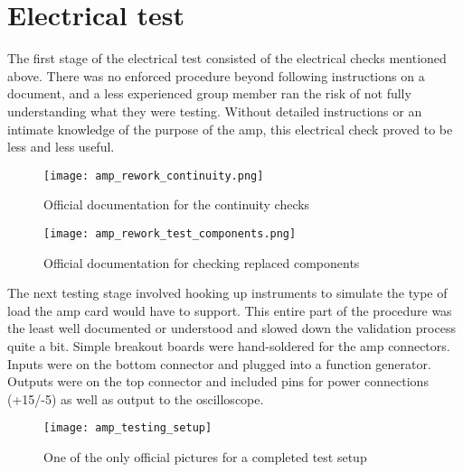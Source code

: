 \section{Electrical test}
The first stage of the electrical test consisted of the electrical checks mentioned above. There was no enforced procedure beyond following instructions on a document, and a less experienced group member ran the risk of not fully understanding what they were testing. Without detailed instructions or an intimate knowledge of the purpose of the amp, this electrical check proved to be less and less useful. \par
\begin{figure}[!htb]
	\texttt{[image: amp\_rework\_continuity.png]}
	\centering
	\caption{Official documentation for the continuity checks}
	\centering
\end{figure}
\begin{figure}[!htb]
	\texttt{[image: amp\_rework\_test\_components.png]}
	\centering
	\caption{Official documentation for checking replaced components}
	\centering
\end{figure}
The next testing stage involved hooking up instruments to simulate the type of load the amp card would have to support. This entire part of the procedure was the least well documented or understood and slowed down the validation process quite a bit. Simple breakout boards were hand-soldered for the amp connectors. Inputs were on the bottom connector and plugged into a function generator. Outputs were on the top connector and included pins for power connections (+15/-5) as well as output to the oscilloscope. 
\begin{figure}[!htb]
	\centering
	\texttt{[image: amp\_testing\_setup]}
	\caption{One of the only official pictures for a completed test setup}
\end{figure}
